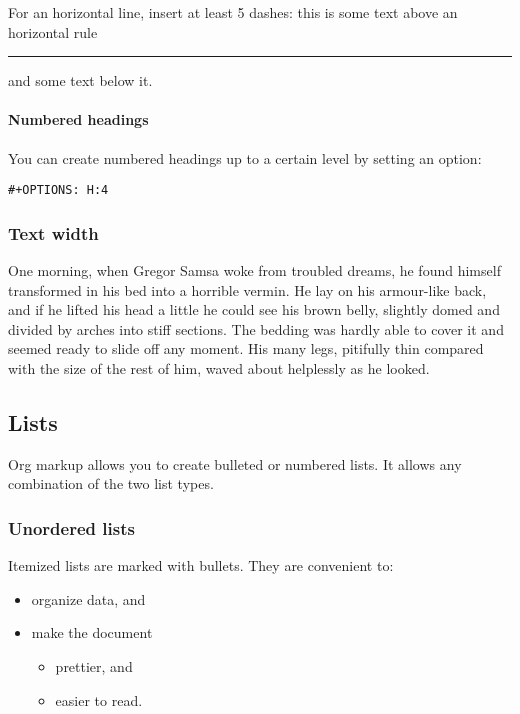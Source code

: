 \documentclass[11pt]{article}
\begin{document}
For an horizontal line, insert at least 5 dashes: this is some text above an
horizontal rule

\noindent\rule{\textwidth}{0.5pt}
and some text below it.

\paragraph*{Numbered headings}
\label{sec:org7a47aca}

You can create numbered headings up to a certain level by setting an option:

\begin{verbatim}
#+OPTIONS: H:4
\end{verbatim}

\subsubsection*{Text width}
\label{sec:orgf9a0e2b}

One morning, when Gregor Samsa woke from troubled dreams, he found himself
transformed in his bed into a horrible vermin. He lay on his armour-like back,
and if he lifted his head a little he could see his brown belly, slightly domed
and divided by arches into stiff sections. The bedding was hardly able to cover
it and seemed ready to slide off any moment. His many legs, pitifully thin
compared with the size of the rest of him, waved about helplessly as he looked.

\subsection*{Lists}
\label{sec:orgce66284}

Org markup allows you to create bulleted or numbered lists. It allows any
combination of the two list types.

\subsubsection*{Unordered lists}
\label{sec:org9f48376}

Itemized lists are marked with bullets. They are convenient to:

\begin{itemize}
\item organize data, and
\item make the document
\begin{itemize}
\item prettier, and
\item easier to read.
\end{itemize}
\end{itemize}
\end{document}
